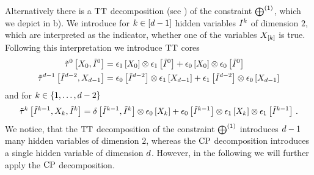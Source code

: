 \begin{example}
    Alternatively there is a $\mathrm{TT}$ decomposition (see ) of the constraint $\bigoplus^{(1)}$, which we depict in  b).
    We introduce for $k\in[d-1]$ hidden variables $I^{k}$ of dimension $2$, which are interpreted as the indicator, whether one of the variables $X_{[k]}$ is true.
    Following this interpretation we introduce $\mathrm{TT}$ cores
    \begin{align*}
        \tilde{\tau}^{0}\left[X_{0},\tilde{I}^{0}\right]
        &= \epsilon_{1}\left[X_{0}\right]\otimes\epsilon_{1}\left[\tilde{I}^{0}\right]
        + \epsilon_{0}\left[X_{0}\right]\otimes\epsilon_{0}\left[\tilde{I}^{0}\right] \\
        \tilde{\tau}^{d-1}\left[\tilde{I}^{d-2},X_{d-1}\right]
        &= \epsilon_{0}\left[\tilde{I}^{d-2}\right] \otimes \epsilon_{1}\left[X_{d-1}\right]
        + \epsilon_{1}\left[\tilde{I}^{d-2}\right] \otimes \epsilon_{0}\left[X_{d-1}\right]
    \end{align*}
    and for $k\in\{1,\ldots,d-2\}$
    \begin{align*}
        \tilde{\tau}^{k}\left[\tilde{I}^{k-1},X_{k},\tilde{I}^{k}\right]
        = \delta\left[\tilde{I}^{k-1},\tilde{I}^{k}\right]  \otimes \epsilon_{0}\left[X_{k}\right]
        + \epsilon_{0}\left[\tilde{I}^{k-1}\right] \otimes \epsilon_{1}\left[X_{k}\right] \otimes \epsilon_{1}\left[\tilde{I}^{k-1}\right] \, .
    \end{align*}
    We notice, that the $\mathrm{TT}$ decomposition of the constraint $\bigoplus^{(1)}$ introduces $d-1$ many hidden variables of dimension $2$, whereas the $\mathrm{CP}$ decomposition introduces a single hidden variable of dimension $d$.
    However, in the following we will further apply the $\mathrm{CP}$ decomposition. %

    \begin{figure}[t]
\end{figure}
\end{example}
